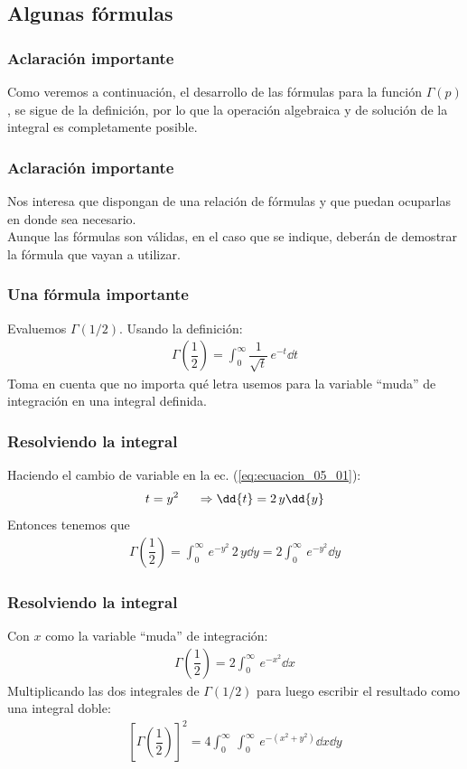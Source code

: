 \subsection{Algunas fórmulas}
\begin{frame}
\frametitle{Aclaración importante}
Como veremos a continuación, el desarrollo de las fórmulas para la función $\Gamma (p)$, se sigue de la definición, por lo que la operación algebraica y de solución de la integral es completamente posible.
\end{frame}
\begin{frame}
   \frametitle{Aclaración importante}
Nos interesa que dispongan de una relación de fórmulas y que puedan ocuparlas en donde sea necesario.
\\
\bigskip
Aunque las fórmulas son válidas, en el caso que se indique, deberán de demostrar la fórmula que vayan a utilizar.
\end{frame}
\begin{frame}
\frametitle{Una fórmula importante}
Evaluemos $\Gamma (1/2)$. Usando la definición:
\begin{align}
\Gamma \left( \dfrac{1}{2}\right) = \int_{0}^{\infty} \dfrac{1}{\sqrt{t}} \, e^{-t} \dd{t}
\label{eq:ecuacion_05_01}
\end{align}
\pause
Toma en cuenta que no importa qué letra usemos para la variable \enquote{muda} de integración en una integral definida.
\end{frame}
\begin{frame}
\frametitle{Resolviendo la integral}
Haciendo el cambio de variable en la ec. (\ref{eq:ecuacion_05_01}):
\begin{align*}
t = y^{2} \hspace{0.5cm} \Rightarrow \dd{t} = 2 \, y \dd{y}
\end{align*}
Entonces tenemos que
\begin{align*}
\Gamma \left( \dfrac{1}{2} \right) = \int_{0}^{\infty} \, e^{-y^{2}} \, 2 \, y \dd{y} = 2 \int_{0}^{\infty} \, e^{-y^{2}} \dd{y}
\end{align*}
\fontsize{12}{12}\selectfont
\end{frame}
\begin{frame}
\frametitle{Resolviendo la integral}
Con $x$ como la variable \enquote{muda} de integración:
\begin{align}
\Gamma \left( \dfrac{1}{2} \right) = 2 \int_{0}^{\infty} \, e^{-x^{2}} \dd{x}
\label{eq:ecuacion_05_02}
\end{align}
\pause
Multiplicando las dos integrales de $\Gamma (1/2)$ para luego escribir el resultado como una integral doble:
\begin{align*}
\left[ \Gamma \left( \dfrac{1}{2} \right) \right]^{2} = 4 \int_{0}^{\infty} \, \int_{0}^{\infty} \, e^{-(x^{2} + y^{2})} \dd{x} \dd{y}
\end{align*}
\end{frame}
